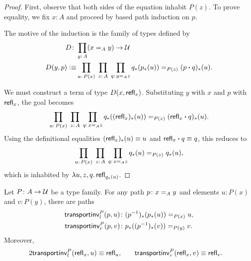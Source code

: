 \begin{proof}
    First, observe that both sides of the equation inhabit $P(z)$. To prove equality, we fix $x\colon A$ and proceed by based path induction on $p$.

    The motive of the induction is the family of types defined by
    \begin{align*}
        D\colon&\prod_{y\colon A}(x\eq Ay)\to\univ\\ 
        D(y,p)\defeq&\prod_{u\colon P(x)}\;
        \prod_{z\colon A}\;\prod_{q\colon y\eq Az}
            q_*(p_*(u))\eq{P(z)}(p\ct q)_*(u).
    \end{align*}
        
    We must construct a term of type $D(x, \mathsf{refl}_x)$. Substituting $y$ with $x$ and $p$ with $\mathsf{refl}_x$, the goal becomes
    \[
        \prod_{u\colon P(x)}\;
            \prod_{z\colon A}\;
            \prod_{q\colon x\eq Az} 
                q_*((\fun{refl}_x)_*(u))\eq{P(z)}
                    (\fun{refl}_x\ct q)_*(u).
    \]
    Using the definitional equalities $(\mathsf{refl}_x)_*(u) \equiv u$ and $\mathsf{refl}_x\mathbin{\boldsymbol{\cdot}} q \equiv q$, this reduces to
    \[
        \prod_{u\colon P(x)}\;
            \prod_{z\colon A}\;
                \prod_{q\colon x\eq Az}
                    q_*(u)\eq{P(z)}q_*(u),
    \]
    which is inhabited by $\lambda u,z,q.\,\mathsf{refl}_{q_*(u)}$.
    
\end{proof}

\begin{lem}\label{lem:transportinv}
    Let\/ $P\colon A\to\univ$ be a type family. For any path\/ $p\colon x\eq{A}y$ and elements\/ $u\colon P(x)$ and\/ $v\colon P(y)$, there are paths
    \begin{align*}
        \fun{transportinv}_l^P(p,u)
            &\colon (p^{-1})_*(p_*(u)) \eq{P(x)}u,\\
        \fun{transportinv}_r^P(p,v)
            &\colon p_*((p^{-1})_*(v)) \eq{P(y)}v.
    \end{align*}
    Moreover,
    \begin{alignat*}2
        \fun{transportinv}^P_l(\fun{refl}_x,u)
            &\equiv\fun{refl}_u,
        &\quad
        \fun{transportinv}^P_r(\fun{refl}_x,v)
            &\equiv\fun{refl}_v.
    \end{alignat*}
\end{lem}

